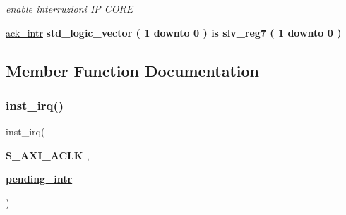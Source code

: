 \begin{DoxyCompactItemize}
\begin{DoxyCompactList}\small\item\em enable interruzioni IP C\+O\+RE \end{DoxyCompactList}\item 
\hyperlink{classUART__v1__0__S00__AXI_1_1arch__imp_a65e0e54a6d565935dd24ce96dbbce53a}{ack\+\_\+intr}  {\bfseries {\bfseries \textcolor{vhdlchar}{std\+\_\+logic\+\_\+vector}\textcolor{vhdlchar}{ }\textcolor{vhdlchar}{(}\textcolor{vhdlchar}{ }\textcolor{vhdlchar}{ } \textcolor{vhdldigit}{1} \textcolor{vhdlchar}{ }\textcolor{vhdlchar}{downto}\textcolor{vhdlchar}{ }\textcolor{vhdlchar}{ } \textcolor{vhdldigit}{0} \textcolor{vhdlchar}{ }\textcolor{vhdlchar}{)}\textcolor{vhdlchar}{ }\textcolor{vhdlchar}{ }\textcolor{vhdlchar}{ }\textcolor{vhdlchar}{ }\textcolor{vhdlchar}{is}\textcolor{vhdlchar}{ }\textcolor{vhdlchar}{slv\+\_\+reg7}\textcolor{vhdlchar}{ }\textcolor{vhdlchar}{(}\textcolor{vhdlchar}{ }\textcolor{vhdlchar}{ } \textcolor{vhdldigit}{1} \textcolor{vhdlchar}{ }\textcolor{vhdlchar}{downto}\textcolor{vhdlchar}{ }\textcolor{vhdlchar}{ } \textcolor{vhdldigit}{0} \textcolor{vhdlchar}{ }\textcolor{vhdlchar}{)}\textcolor{vhdlchar}{ }}} {\bfseries \textcolor{vhdlchar}{ }} 
\end{DoxyCompactItemize}


\subsection{Member Function Documentation}
\mbox{\label{classUART__v1__0__S00__AXI_1_1arch__imp_a48d068c63e454a766cd9703aff942fb6}} 
\subsubsection{\texorpdfstring{inst\+\_\+irq()}{inst\_irq()}}
{\footnotesize\ttfamily  {\bfseries \textcolor{vhdlchar}{ }} inst\+\_\+irq(\begin{DoxyParamCaption}\item[{}]{{\bfseries \textcolor{vhdlchar}{S\+\_\+\+A\+X\+I\+\_\+\+A\+C\+LK}\textcolor{vhdlchar}{ }} {\em } ,  }\item[{}]{{\bfseries {\bfseries \hyperlink{classUART__v1__0__S00__AXI_1_1arch__imp_a5595ca2e548ef1d12b7fa2bac3e2aa00}{pending\+\_\+intr}} \textcolor{vhdlchar}{ }} {\em } }\end{DoxyParamCaption})\hspace{0.3cm}{\ttfamily [Process]}}



